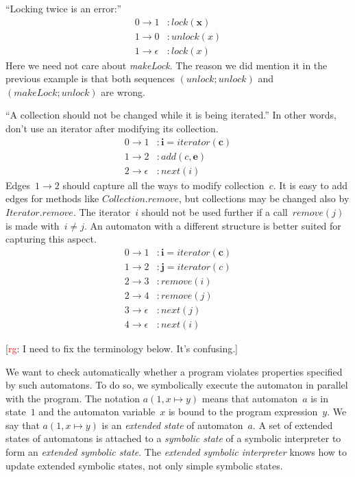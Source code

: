\documentclass[a4paper]{article}
\newcommand{\rg}[1]{\todo{rg}{#1}}
\newcommand{\todo}[2]{{\small [\textcolor{red}{#1}: #2]}}
\theoremstyle{slanted}
\theoremstyle{definition}
\theoremstyle{remark}
\begin{document}
``Locking twice is an error:''
\begin{equation}
\begin{aligned}
0\to1&: \mathit{lock}(\mathbf x)\\
1\to0&: \mathit{unlock}(x)\\
1\to\epsilon&: \mathit{lock}(x)
\end{aligned}
\end{equation}
Here we need not care about \textit{makeLock}.
The reason we did mention it in the previous example is that both sequences $(\mathit{unlock}; \mathit{unlock})$ and $(\mathit{makeLock}; \mathit{unlock})$ are wrong.

``A collection should not be changed while it is being iterated.''
In other words, don't use an iterator after modifying its collection.
\begin{equation}\label{eq:iter1}
\begin{aligned}
0\to1&: \mathbf{i} = \mathit{iterator}(\mathbf{c})\\
1\to2&: \mathit{add}(c, \mathbf{e}) \\
2\to\epsilon&: \mathit{next}(i)
\end{aligned}
\end{equation}
Edges~$1\to2$ should capture all the ways to modify collection~$c$.
It is easy to add edges for methods like $\mathit{Collection}.\mathit{remove}$, but collections may be changed also by $\mathit{Iterator}.\mathit{remove}$.
The iterator~$i$ should not be used further if a call~$\mathit{remove}(j)$ is made with~$i\ne j$.
An automaton with a different structure is better suited for capturing this aspect.
\begin{equation}\label{eq:iter2}
\begin{aligned}
0\to1&: \mathbf{i} = \mathit{iterator}(\mathbf{c})\\
1\to2&: \mathbf{j} = \mathit{iterator}(c)\\
2\to3&: \mathit{remove}(i)\\
2\to4&: \mathit{remove}(j)\\
3\to\epsilon&: \mathit{next}(j)\\
4\to\epsilon&: \mathit{next}(i)
\end{aligned}
\end{equation}

\rg{I need to fix the terminology below. It's confusing.}

We want to check automatically whether a program violates properties specified by such automatons.
To do so, we symbolically execute the automaton in parallel with the program.
The notation $a(1, x\mapsto y)$ means that automaton~$a$ is in state~$1$ and the automaton variable~$x$ is bound to the program expression~$y$.
We say that $a(1,x\mapsto y)$ is an \emph{extended state} of automaton~$a$.
A set of extended states of automatons is attached to a \emph{symbolic state} of a symbolic interpreter to form an \emph{extended symbolic state}.
The \emph{extended symbolic interpreter} knows how to update extended symbolic states, not only simple symbolic states.
\end{document}
